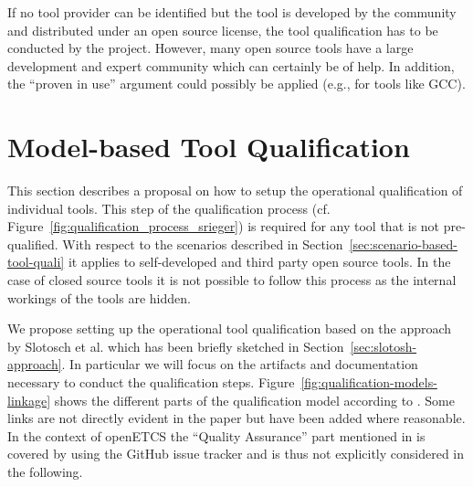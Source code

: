 If no tool provider can be identified but the tool is developed by the community and distributed under an open source license, the tool qualification has to be conducted by the project. However, many open source tools have a large development and expert community which can certainly be of help. In addition, the ``proven in use'' argument could possibly be applied (e.g., for tools like GCC).

\section{Model-based Tool Qualification}
\label{sec:model-based-tool-quali}

This section describes a proposal on how to setup the operational qualification of individual tools. This step of the qualification process (cf. Figure~\ref{fig:qualification_process_srieger}) is required for any tool that is not pre-qualified. With respect to the scenarios described in Section~\ref{sec:scenario-based-tool-quali} it applies to self-developed and third party open source tools. In the case of closed source tools it is not possible to follow this process as the internal workings of the tools are hidden.

We propose setting up the operational tool qualification based on the approach by Slotosch et al. which has been briefly sketched in Section~\ref{sec:slotosh-approach}. In particular we will focus on the artifacts and documentation necessary to conduct the qualification steps. Figure~\ref{fig:qualification-models-linkage} shows the different parts of the qualification model according to \cite{slotosch_model-based_2012}. Some links are not directly evident in the paper but have been added where reasonable. In the context of openETCS the ``Quality Assurance'' part mentioned in \cite{slotosch_model-based_2012} is covered by using the GitHub issue tracker and is thus not explicitly considered in the following.

